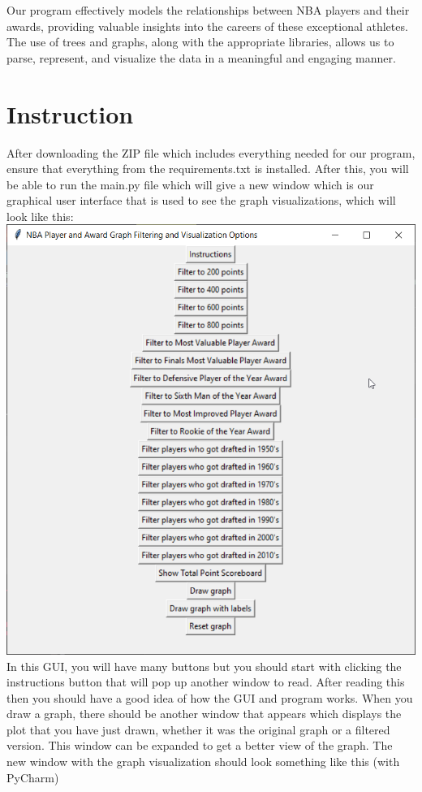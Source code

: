 \documentclass[fontsize=11pt]{article}
\begin{document}
Our program effectively models the relationships between NBA players and their awards, providing valuable insights into the careers of these exceptional athletes. The use of trees and graphs, along with the appropriate libraries, allows us to parse, represent, and visualize the data in a meaningful and engaging manner.

\section{Instruction}

After downloading the ZIP file which includes everything needed for our program, ensure that everything from the requirements.txt is installed. After this, you will be able to run the main.py file which will give a new window which is our graphical user interface that is used to see the graph visualizations, which will look like this:\\
\includegraphics[width=18cm]{gui.png}
In this GUI, you will have many buttons but you should start with clicking the instructions button that will pop up another window to read. After reading this then you should have a good idea of how the GUI and program works. When you draw a graph, there should be another window that appears which displays the plot that you have just drawn, whether it was the original graph or a filtered version. This window can be expanded to get a better view of the graph. The new window with the graph visualization should look something like this (with PyCharm)\\
\end{document}
